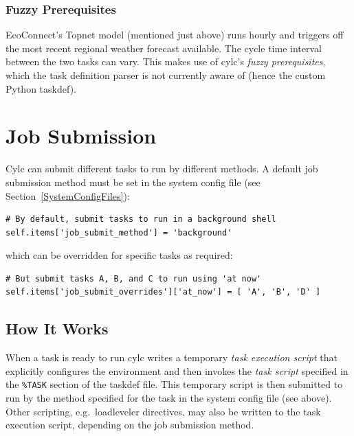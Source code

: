 \documentclass[11pt,a4paper]{article}
\begin{document}
\subsubsection{Fuzzy Prerequisites}

EcoConnect's Topnet model (mentioned just above) runs hourly and
triggers off the most recent regional weather forecast available.
The cycle time interval between the two tasks can vary. This makes 
use of cylc's {\em fuzzy prerequisites}, which the task definition
parser is not currently aware of (hence the custom Python taskdef).

\pagebreak
\section{Job Submission}
\label{JobSubmission}

Cylc can submit different tasks to run by different methods.  A default
job submission method must be set in the system config file (see
Section~\ref{SystemConfigFiles}):
 
\lstset{language=Python}

\begin{lstlisting}
# By default, submit tasks to run in a background shell
self.items['job_submit_method'] = 'background'
\end{lstlisting}
 
which can be overridden for specific tasks as required:

\begin{lstlisting}
# But submit tasks A, B, and C to run using 'at now'
self.items['job_submit_overrides']['at_now'] = [ 'A', 'B', 'D' ]
\end{lstlisting}

\subsection{How It Works}
\label{HowItWorks}

\lstset{language=cylctaskdef}

When a task is ready to run cylc writes a temporary {\em task execution
script} that explicitly configures the environment and then invokes the
{\em task script} specified in the \lstinline=%TASK= section of the
taskdef file. This temporary script is then submitted to run by the
method specified for the task in the system config file (see above).
Other scripting, e.g.\ loadleveler directives, may also be written to
the task execution script, depending on the job submission method.
\end{document}
